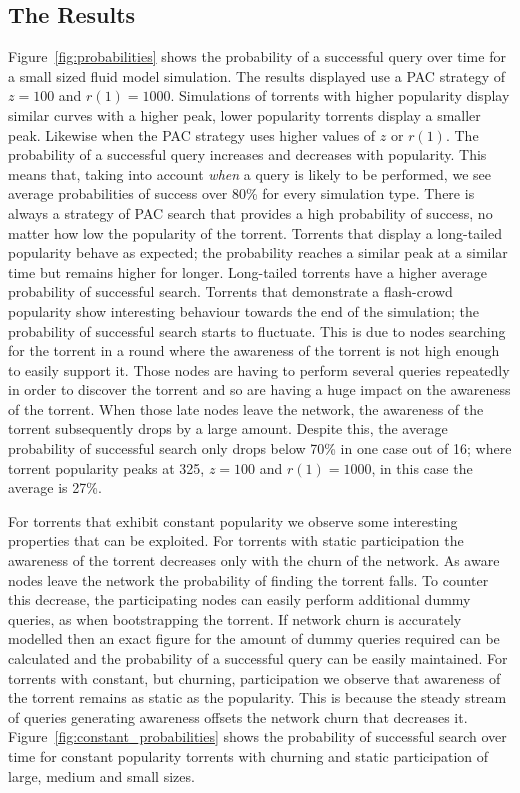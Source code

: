 \subsection{The Results}
    
    Figure~\ref{fig:probabilities} shows the probability of a successful query over time for a small sized fluid model simulation. The results displayed use a PAC strategy of $z=100$ and $r(1)=1000$. Simulations of torrents with higher popularity display similar curves with a higher peak, lower popularity torrents display a smaller peak. Likewise when the PAC strategy uses higher values of $z$ or $r(1)$. The probability of a successful query increases and decreases with popularity. This means that, taking into account \emph{when} a query is likely to be performed, we see average probabilities of success over 80\% for every simulation type. There is always a strategy of PAC search that provides a high probability of success, no matter how low the popularity of the torrent. Torrents that display a long-tailed popularity behave as expected; the probability reaches a similar peak at a similar time but remains higher for longer. Long-tailed torrents have a higher average probability of successful search. Torrents that demonstrate a flash-crowd popularity show interesting behaviour towards the end of the simulation; the probability of successful search starts to  fluctuate. This is due to nodes searching for the torrent in a round where the awareness of the torrent is not high enough to easily support it. Those nodes are having to perform several queries repeatedly in order to discover the torrent and so are having a huge impact on the awareness of the torrent. When those late nodes leave the network, the awareness of the torrent subsequently drops by a large amount. Despite this, the average probability of successful search only drops below 70\% in one case out of 16; where torrent popularity peaks at 325, $z=100$ and $r(1)=1000$, in this case the average is 27\%.

    For torrents that exhibit constant popularity we observe some interesting properties that can be exploited. For torrents with static participation the awareness of the torrent decreases only with the churn of the network. As aware nodes leave the network the probability of finding the torrent falls. To counter this decrease, the participating nodes can easily perform additional dummy queries, as when bootstrapping the torrent. If network churn is accurately modelled then an exact figure for the amount of dummy queries required can be calculated and the probability of a successful query can be easily maintained. For torrents with constant, but churning, participation we observe that awareness of the torrent remains as static as the popularity. This is because the steady stream of queries generating awareness offsets the network churn that decreases it. Figure~\ref{fig:constant_probabilities} shows the probability of successful search over time for constant popularity torrents with churning and static participation of large, medium and small sizes.

